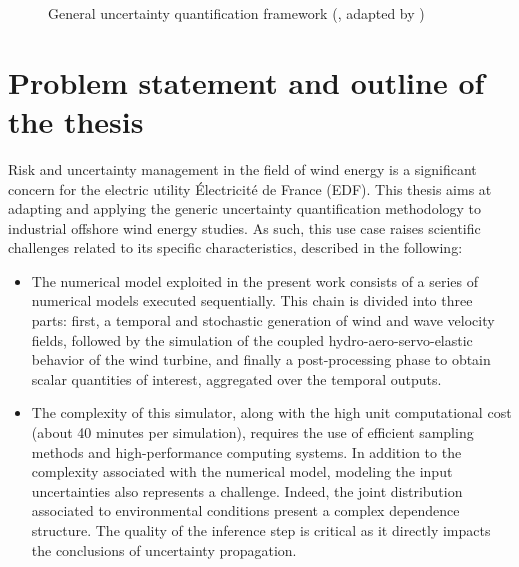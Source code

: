 \begin{figure}[!h]
    \centering
    
    \caption{General uncertainty quantification framework (\cite{rocquigny_2008}, adapted by \cite{ajenjo_2023})}
    \label{fig:UQ_methodo}
\end{figure}


\section*{Problem statement and outline of the thesis}

Risk and uncertainty management in the field of wind energy is a significant concern for the electric utility Électricité de France (EDF). 
This thesis aims at adapting and applying the generic uncertainty quantification methodology to industrial offshore wind energy studies. 
As such, this use case raises scientific challenges related to its specific characteristics, described in the following:
\begin{itemize}
    \item The numerical model exploited in the present work consists of a series of numerical models executed sequentially. 
    This chain is divided into three parts: first, a temporal and stochastic generation of wind and wave velocity fields, 
    followed by the simulation of the coupled hydro-aero-servo-elastic behavior of the wind turbine, 
    and finally a post-processing phase to obtain scalar quantities of interest, aggregated over the temporal outputs. 
    \item The complexity of this simulator, along with the high unit computational cost (about 40 minutes per simulation), requires the use of efficient sampling methods and high-performance computing systems. 
    In addition to the complexity associated with the numerical model, modeling the input uncertainties also represents a challenge. 
    Indeed, the joint distribution associated to environmental conditions present a complex dependence structure.   
    The quality of the inference step is critical as it directly impacts the conclusions of uncertainty propagation.
\end{itemize}

